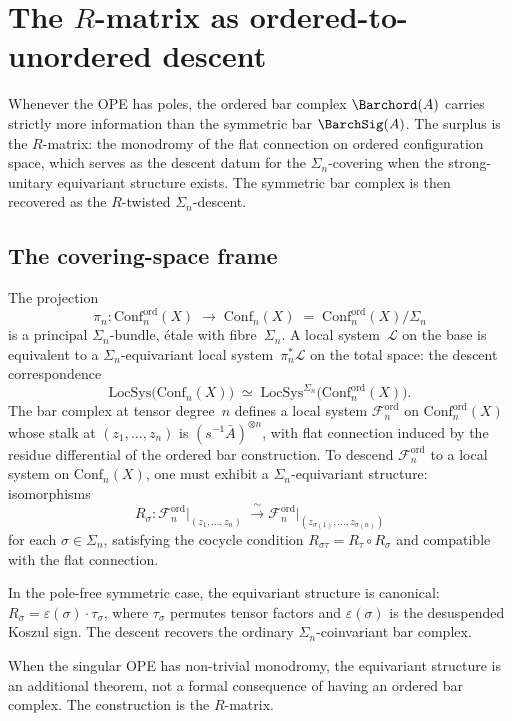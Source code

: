 \section{The $R$-matrix as ordered-to-unordered descent}
\label{sec:r-matrix-descent}

Whenever the OPE has poles, the ordered bar complex $\Barchord(A)$
carries strictly more information than the symmetric bar $\BarchSig(A)$.
The surplus is the $R$-matrix: the monodromy of the flat connection
on ordered configuration space, which serves as the descent datum
for the $\Sigma_n$-covering when the strong-unitary equivariant
structure exists. The symmetric bar complex is then recovered as the
$R$-twisted $\Sigma_n$-descent.

\subsection*{The covering-space frame}

\begin{construction}
\label{constr:r-matrix-covering-vol1}
The projection
\[
\pi_n\colon
\mathrm{Conf}_n^{\mathrm{ord}}(X)
\;\longrightarrow\;
\mathrm{Conf}_n(X)
\;=\;
\mathrm{Conf}_n^{\mathrm{ord}}(X)/\Sigma_n
\]
is a principal $\Sigma_n$-bundle, \'etale with fibre~$\Sigma_n$.
A local system~$\mathcal{L}$ on the base is equivalent to a
$\Sigma_n$-equivariant local system~$\pi_n^*\mathcal{L}$
on the total space: the descent correspondence
\[
\mathrm{LocSys}\bigl(\mathrm{Conf}_n(X)\bigr)
\;\simeq\;
\mathrm{LocSys}^{\Sigma_n}
\bigl(\mathrm{Conf}_n^{\mathrm{ord}}(X)\bigr).
\]
The bar complex at tensor degree~$n$ defines a local system
$\mathcal{F}_n^{\mathrm{ord}}$ on $\mathrm{Conf}_n^{\mathrm{ord}}(X)$
whose stalk at $(z_1,\dots,z_n)$ is
$(s^{-1}\bar A)^{\otimes n}$, with flat connection induced by the
residue differential of the ordered bar construction. To descend
$\mathcal{F}_n^{\mathrm{ord}}$ to a local system on $\mathrm{Conf}_n(X)$,
one must exhibit a $\Sigma_n$-equivariant structure: isomorphisms
\[
R_\sigma\colon
\mathcal{F}_n^{\mathrm{ord}}\big|_{(z_1,\dots,z_n)}
\;\xrightarrow{\;\sim\;}
\mathcal{F}_n^{\mathrm{ord}}\big|_{(z_{\sigma(1)},\dots,z_{\sigma(n)})}
\]
for each $\sigma\in\Sigma_n$, satisfying the cocycle condition
$R_{\sigma\tau}=R_\tau\circ R_\sigma$ and compatible with the
flat connection.

In the pole-free symmetric case, the equivariant structure is
canonical: $R_\sigma=\varepsilon(\sigma)\cdot\tau_\sigma$, where
$\tau_\sigma$ permutes tensor factors and $\varepsilon(\sigma)$ is
the desuspended Koszul sign. The descent recovers the ordinary
$\Sigma_n$-coinvariant bar complex.

When the singular OPE has non-trivial monodromy, the equivariant
structure is an additional theorem, not a formal consequence of
having an ordered bar complex. The construction is the $R$-matrix.
\end{construction}

